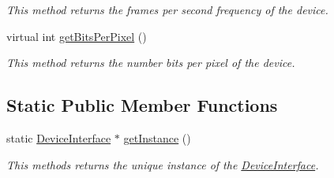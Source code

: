 \begin{DoxyCompactItemize}
\begin{DoxyCompactList}\small\item\em This method returns the frames per second frequency of the device. \item\end{DoxyCompactList}\item 
virtual int \hyperlink{classbr_1_1ufscar_1_1lince_1_1xpta_1_1streaming_1_1DeviceInterface_af71e87af3a4635ff79a9e11a860d2c22}{getBitsPerPixel} ()
\begin{DoxyCompactList}\small\item\em This method returns the number bits per pixel of the device. \item\end{DoxyCompactList}\end{DoxyCompactItemize}
\subsection*{Static Public Member Functions}
\begin{DoxyCompactItemize}
\item 
static \hyperlink{classbr_1_1ufscar_1_1lince_1_1xpta_1_1streaming_1_1DeviceInterface}{DeviceInterface} $\ast$ \hyperlink{classbr_1_1ufscar_1_1lince_1_1xpta_1_1streaming_1_1DeviceInterface_aeb8554f01e992799ab15336f45829cd6}{getInstance} ()
\begin{DoxyCompactList}\small\item\em This methods returns the unique instance of the \hyperlink{classbr_1_1ufscar_1_1lince_1_1xpta_1_1streaming_1_1DeviceInterface}{DeviceInterface}. \item\end{DoxyCompactList}\end{DoxyCompactItemize}
